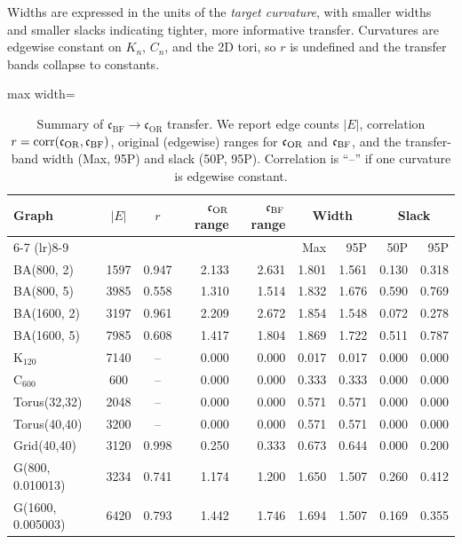 \documentclass[twoside,11pt]{article}
\numberwithin{equation}{section}
\numberwithin{theorem}{section}
\numberwithin{example}{section}
\begin{document}
Widths are expressed in the units of the \emph{target curvature}, with smaller widths and smaller slacks indicating tighter, more informative transfer. Curvatures are edgewise constant on $K_n$, $C_n$, and the 2D tori, so $r$ is undefined and the transfer bands collapse to constants. 

\begin{table}
\centering
\caption{Summary of $\mathfrak c_{\mathrm{BF}}\!\to\!\mathfrak c_{\mathrm{OR}}$ transfer. 
We report edge counts $|E|$, correlation $r=\mathrm{corr}(\mathfrak c_{\rm OR}, \mathfrak c_{\rm BF})$, 
original (edgewise) ranges for $\mathfrak c_{\rm OR}$ and $\mathfrak c_{\rm BF}$, and the transfer-band width (Max, 95P) and slack (50P, 95P). 
Correlation is “--” if one curvature is edgewise constant.}
\label{tab:bandwidth_bf2or}
\begin{adjustbox}{max width=\textwidth}
\footnotesize
\setlength{\tabcolsep}{4pt}
\begin{tabular}{l c c r r r r r r}
\toprule
Graph & $|E|$ & $r$ & $\mathfrak c_{\rm OR}$ range & $\mathfrak c_{\rm BF}$ range & \multicolumn{2}{c}{Width} & \multicolumn{2}{c}{Slack} \\
\cmidrule(lr){6-7} \cmidrule(lr){8-9}
& & & & & Max & 95P & 50P & 95P \\
\midrule
BA(800, 2) & 1597 & 0.947 & 2.133 & 2.631 & 1.801 & 1.561 & 0.130 & 0.318 \\
BA(800, 5) & 3985 & 0.558 & 1.310 & 1.514 & 1.832 & 1.676 & 0.590 & 0.769 \\
BA(1600, 2) & 3197 & 0.961 & 2.209 & 2.672 & 1.854 & 1.548 & 0.072 & 0.278 \\
BA(1600, 5) & 7985 & 0.608 & 1.417 & 1.804 & 1.869 & 1.722 & 0.511 & 0.787 \\
K$_{120}$ & 7140 & -- & 0.000 & 0.000 & 0.017 & 0.017 & 0.000 & 0.000 \\
C$_{600}$ & 600 & -- & 0.000 & 0.000 & 0.333 & 0.333 & 0.000 & 0.000 \\
Torus(32,32) & 2048 & -- & 0.000 & 0.000 & 0.571 & 0.571 & 0.000 & 0.000 \\
Torus(40,40) & 3200 & -- & 0.000 & 0.000 & 0.571 & 0.571 & 0.000 & 0.000 \\
Grid(40,40) & 3120 & 0.998 & 0.250 & 0.333 & 0.673 & 0.644 & 0.000 & 0.200 \\
G(800, 0.010013) & 3234 & 0.741 & 1.174 & 1.200 & 1.650 & 1.507 & 0.260 & 0.412 \\
G(1600, 0.005003) & 6420 & 0.793 & 1.442 & 1.746 & 1.694 & 1.507 & 0.169 & 0.355 \\

\end{tabular}
\end{adjustbox}
\end{table}
\end{document}
